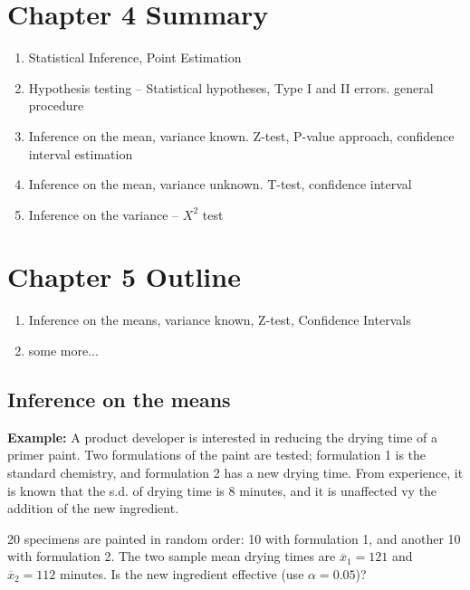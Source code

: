 \documentclass[12pt]{amsart}
\begin{document}
\section*{Chapter 4 Summary}

\begin{enumerate}

\item Statistical Inference, Point Estimation

\item Hypothesis testing -- Statistical hypotheses, Type I and II errors. general procedure

\item Inference on the mean, variance known. Z-test, P-value approach, confidence interval estimation

\item Inference on the mean, variance unknown. T-test, confidence interval

\item Inference on the variance -- $X^{2}$ test

\end{enumerate}

\section*{Chapter 5 Outline}
\begin{enumerate}

\item Inference on the means, variance known, Z-test, Confidence Intervals

\item some more...

\end{enumerate}

\subsection*{Inference on the means}

\textbf{Example:} A product developer is interested in reducing the drying time of a primer paint. Two formulations of the paint are tested; formulation 1 is the standard chemistry, and formulation 2 has a new drying time. From experience, it is known that the s.d. of drying time is 8 minutes, and it is unaffected vy the addition of the new ingredient.

20 specimens are painted in random order: 10 with formulation 1, and another 10 with formulation 2. The two sample mean drying times are $\overline{x}_1 = 121$ and $\overline{x}_2 = 112$ minutes. Is the new ingredient effective (use $\alpha = 0.05$)?
\end{document}

